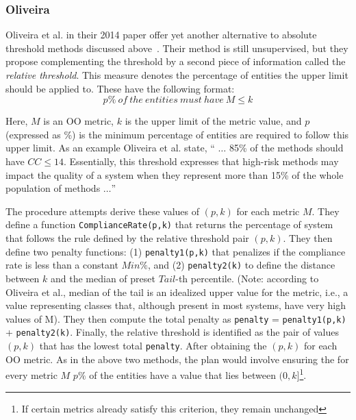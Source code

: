 \documentclass[10pt,journal,compsoc]{IEEEtran}
\begin{document}
\subsubsection{Oliveira}
Oliveira et al. in their 2014 paper offer yet another alternative to absolute threshold methods discussed above~\cite{oliveira}. Their method is still unsupervised, but they propose complementing the threshold by a second piece of information called the \textit{relative threshold}. This measure denotes the percentage of entities the upper limit should be applied to. These have the following format:
\begin{equation*}
	p\%\ of\ the\ entities\ must\ have\ M\leq k
\end{equation*}

Here, $M$ is an OO metric, $k$ is the upper limit of the metric value, and $p$ (expressed as \%) is the minimum percentage of entities are required to follow this upper limit. As an example Oliveira et al. state, `` $\ldots$ 85\% of the methods should have $CC \leq 14$. Essentially, this threshold expresses that high-risk methods may impact the quality of a system when they represent more than 15\% of the whole population of methods $\ldots$''

The procedure attempts derive these values of $(p,k)$ for each metric $M$. They define a function \texttt{ComplianceRate(p,k)} that returns the percentage of system that follows the rule defined by the relative threshold pair $(p,k)$. They then define two penalty functions: (1) \texttt{penalty1(p,k)} that penalizes if the compliance rate is less than a constant $Min\%$, and (2) \texttt{penalty2(k)} to define the distance between $k$ and the median of preset $Tail$-th percentile. (Note: according to Oliveira et al., median of the tail is an idealized upper value for the metric, i.e., a value representing classes that, although present in most systems, have very high values of M). They then compute the total penalty as \texttt{penalty} = \texttt{penalty1(p,k)} + \texttt{penalty2(k)}. Finally, the relative threshold is identified as the pair of values $(p,k)$ that has the lowest total \texttt{penalty}. After obtaining the $(p,k)$ for each OO metric. As in the above two methods, the plan would involve ensuring the for every metric $M$ $p\%$ of the entities have a value that lies between $(0,k]$\footnote{If certain metrics already satisfy this criterion, they remain unchanged}. 





\end{document}
